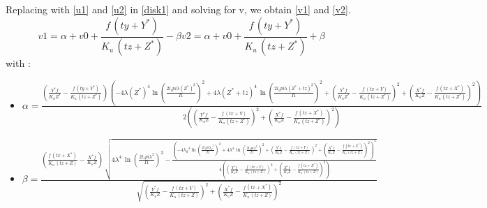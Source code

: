 Replacing with \eqref{u1} and \eqref{u2} in \eqref{disk1} and solving for v, we obtain \eqref{v1} and \eqref{v2}.
\begin{subequations}
    \begin{equation}
        v1 = \alpha +\mathit{v0}+\frac{f\, \left( \mathit{ty}+Y^{*}\right) }{\mathit{K_{u}}\, \left( \mathit{tz}+Z^{*}\right) }-\beta
        \label{v1}
    \end{equation}
    \begin{equation}
        v2 = \alpha +\mathit{v0}+\frac{f\, \left( \mathit{ty}+Y^{*}\right) }{\mathit{K_{u}}\, \left( \mathit{tz}+Z^{*}\right) }+\beta
        \label{v2}
    \end{equation}
\end{subequations}
with :
\begin{itemize}
    \item $\alpha = \frac{\left( \frac{Y^{*} f}{\mathit{K_{u}} Z^{*}}-\frac{f\, \left( \mathit{ty}+Y^{*}\right) }{\mathit{K_{u}}\, \left( \mathit{tz}+Z^{*}\right) }\right) \, \left( -4 {{{\lambda }(Z^{*})}^{4}} {{\ln{\left( \frac{2 {l_1} pi {{{\lambda }(Z^{*})}^{2}}}{\mathit{I1}}\right) }}^{2}}+4 {{\lambda }(Z^{*}+tz)^{4}}\, {{\ln{\left( \frac{2 {l_1} pi {{\lambda }(Z^{*}+tz)^{2}}}{\mathit{I1}}\right) }}^{2}}+{{\left(\frac{Y^{*} f}{\mathit{K_{u}} Z^{*}}-\frac{f\, \left( \mathit{tx}+Y\right) }{\mathit{K_{u}}\, \left( \mathit{tz}+Z^{*}\right) }\right) }^{2}}+{{\left( \frac{X^{*} f}{\mathit{K_{u}} Z}-\frac{f\, \left( \mathit{tx}+X^{*}\right) }{\mathit{K_{u}}\, \left( \mathit{tz}+Z^{*}\right) }\right) }^{2}}\right) }{2 \left( {{\left( \frac{Y^{*} f}{\mathit{K_{u}} Z}-\frac{f\, \left( \mathit{tx}+Y\right) }{\mathit{K_{u}}\, \left( \mathit{tz}+Z^{*}\right) }\right) }^{2}}+{{\left( \frac{X^{*} f}{\mathit{K_{u}} Z}-\frac{f\, \left( \mathit{tx}+X^{*}\right) }{\mathit{K_{u}}\, \left( \mathit{tz}+Z^{*}\right) }\right) }^{2}}\right) }$
    \item $\beta = \frac{\left( \frac{f\, \left( \mathit{tx}+X^{*}\right) }{\mathit{K_{u}}\, \left( \mathit{tz}+Z\right) }-\frac{X^{*} f}{\mathit{K_{u}} Z}\right) \, \sqrt{4 {{\lambda }^{4}}\, {{\ln{\left( \frac{2 {l_1} pi {{\lambda }^{2}}}{\mathit{I1}}\right) }}^{2}}-\frac{{{\left( -4 {{{{\lambda }_d}}^{4}} {{\ln{\left( \frac{2 {l_1} pi {{{{\lambda }_d}}^{2}}}{\mathit{I1}}\right) }}^{2}}+4 {{\lambda }^{4}}\, {{\ln{\left( \frac{2 {l_1} pi {{\lambda }^{2}}}{\mathit{I1}}\right) }}^{2}}+{{\left( \frac{Y^{*} f}{\mathit{K_{u}} Z}-\frac{f\, \left( \mathit{tx}+Y\right) }{\mathit{K_{u}}\, \left( \mathit{tz}+Z\right) }\right) }^{2}}+{{\left( \frac{X^{*} f}{\mathit{K_{u}} Z}-\frac{f\, \left( \mathit{tx}+X^{*}\right) }{\mathit{K_{u}}\, \left( \mathit{tz}+Z\right) }\right) }^{2}}\right) }^{2}}}{4 \left( {{\left( \frac{Y^{*} f}{\mathit{K_{u}} Z}-\frac{f\, \left( \mathit{tx}+Y\right) }{\mathit{K_{u}}\, \left( \mathit{tz}+Z\right) }\right) }^{2}}+{{\left( \frac{X^{*} f}{\mathit{K_{u}} Z}-\frac{f\, \left( \mathit{tx}+X^{*}\right) }{\mathit{K_{u}}\, \left( \mathit{tz}+Z\right) }\right) }^{2}}\right) }}}{\sqrt{{{\left( \frac{Y^{*} f}{\mathit{K_{u}} Z}-\frac{f\, \left( \mathit{tx}+Y\right) }{\mathit{K_{u}}\, \left( \mathit{tz}+Z\right) }\right) }^{2}}+{{\left( \frac{X^{*} f}{\mathit{K_{u}} Z}-\frac{f\, \left( \mathit{tx}+X^{*}\right) }{\mathit{K_{u}}\, \left( \mathit{tz}+Z\right) }\right) }^{2}}}} $

\end{itemize}
